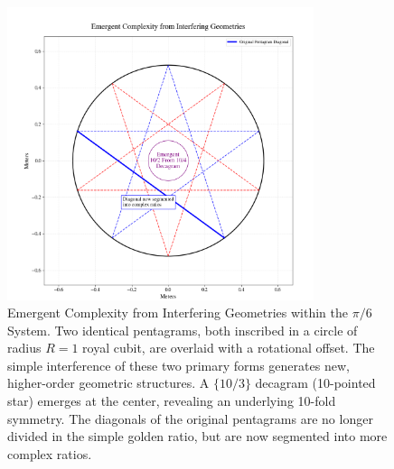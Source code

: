 \documentclass[11pt]{article}
\begin{document}
\begin{figure}[htbp]
\centering
\includegraphics[width=0.8\textwidth]{figures/interfering-fig.png}
\caption{Emergent Complexity from Interfering Geometries within the $\pi/6$ System. Two identical pentagrams, both inscribed in a circle of radius $R = 1$ royal cubit, are overlaid with a rotational offset. The simple interference of these two primary forms generates new, higher-order geometric structures. A $\{10/3\}$ decagram (10-pointed star) emerges at the center, revealing an underlying 10-fold symmetry. The diagonals of the original pentagrams are no longer divided in the simple golden ratio, but are now segmented into more complex ratios.}
\label{fig:interfering_geometries}
\end{figure}
\end{document}
